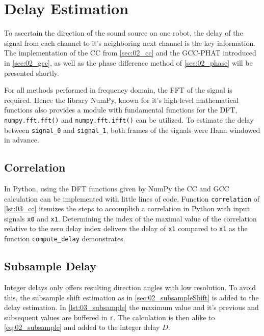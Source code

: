 \section{Delay Estimation}
\label{sec:03_delay}

To ascertain the direction of the sound source on one robot, the
delay of the signal from each channel to it's neighboring
next channel is the key information.
The implementation of the \ac{CC} from \cref{sec:02_cc} and the \ac{GCC-PHAT}
introduced in \cref{sec:02_gcc}, as well as the phase difference method
of \cref{sec:02_phase} will be presented shortly.

For all methods performed in frequency domain, the \ac{FFT} of the
signal is required. Hence the library NumPy, known for it's high-level
mathematical functions also provides a module with fundamental
functions for the \ac{DFT}, \lstinline!numpy.fft.fft()! and
\lstinline!numpy.fft.ifft()! can be utilized.
To estimate the delay between \lstinline!signal_0! and \lstinline!signal_1!,
both frames of the signals were Hann windowed in advance.
\subsection*{Correlation}
\label{subsec:03_cc}

In Python, using the \ac{DFT} functions given by NumPy the \ac{CC} and \ac{GCC} calculation
can be implemented with little lines of code.
Function \lstinline!correlation! of \cref{lst:03_cc} itemizes the steps to accomplish
a correlation in Python with input signals \lstinline!x0! and \lstinline!x1!.
Determining the index of the maximal value of the correlation relative to the zero delay
index delivers the delay of \lstinline!x1! compared to \lstinline!x1! as the function
\lstinline!compute_delay! demonstrates.
\subsection*{Subsample Delay}
\label{subsec:03_subsample}

Integer delays only offers resulting direction angles with low resolution.
To avoid this, the subsample shift estimation as in \cref{sec:02_subsampleShift}
is added to the delay estimation.
In \cref{lst:03_subsample} the maximum value and it's previous and subsequent values
are buffered in \lstinline!r!. The calculation is then alike to \cref{eq:02_subsample}
and added to the integer delay $D$.

